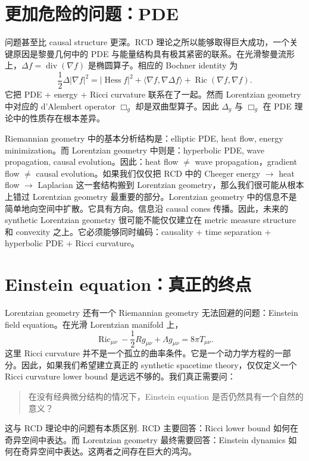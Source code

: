 \documentclass[lualatex]{article}
\begin{document}
\section{更加危险的问题：PDE}

问题甚至比 causal structure 更深。RCD 理论之所以能够取得巨大成功，一个关键原因是黎曼几何中的 PDE 与能量结构具有极其紧密的联系。在光滑黎曼流形上，$\Delta f = \operatorname{div}(\nabla f)$ 是椭圆算子。相应的 Bochner identity 为
\[
\frac{1}{2}\Delta |\nabla f|^2 = |\operatorname{Hess}f|^2 + \langle \nabla f, \nabla\Delta f \rangle + \operatorname{Ric}(\nabla f,\nabla f).
\]
它把 PDE + energy + Ricci curvature 联系在了一起。然而 Lorentzian geometry 中对应的 d'Alembert operator $\Box_g$ 却是双曲型算子。因此 $\Delta_g$ 与 $\Box_g$ 在 PDE 理论中的性质存在根本差异。

Riemannian geometry 中的基本分析结构是：elliptic PDE, heat flow, energy minimization。而 Lorentzian geometry 中则是：hyperbolic PDE, wave propagation, causal evolution。因此：heat flow $\neq$ wave propagation，gradient flow $\neq$ causal evolution。如果我们仅仅把 RCD 中的 Cheeger energy $\longrightarrow$ heat flow $\longrightarrow$ Laplacian 这一套结构搬到 Lorentzian geometry，那么我们很可能从根本上错过 Lorentzian geometry 最重要的部分。Lorentzian geometry 中的信息不是简单地向空间中扩散。它具有方向。信息沿 causal cones 传播。因此，未来的 synthetic Lorentzian geometry 很可能不能仅仅建立在 metric measure structure 和 convexity 之上。它必须能够同时编码：causality + time separation + hyperbolic PDE + Ricci curvature。

\section{Einstein equation：真正的终点}

Lorentzian geometry 还有一个 Riemannian geometry 无法回避的问题：Einstein field equation。在光滑 Lorentzian manifold 上，
\[
    \operatorname{Ric}_{\mu\nu} - \frac{1}{2}R g_{\mu\nu} + \Lambda g_{\mu\nu} = 8\pi T_{\mu\nu}.
\]
这里 Ricci curvature 并不是一个孤立的曲率条件。它是一个动力学方程的一部分。因此，如果我们希望建立真正的 synthetic spacetime theory，仅仅定义一个 Ricci curvature lower bound 是远远不够的。我们真正需要问：

\begin{quote}
在没有经典微分结构的情况下，Einstein equation 是否仍然具有一个自然的意义？
\end{quote}

这与 RCD 理论中的问题有本质区别. RCD 主要回答：Ricci lower bound 如何在奇异空间中表达。而 Lorentzian geometry 最终需要回答：Einstein dynamics 如何在奇异空间中表达。这两者之间存在巨大的鸿沟。
\end{document}
